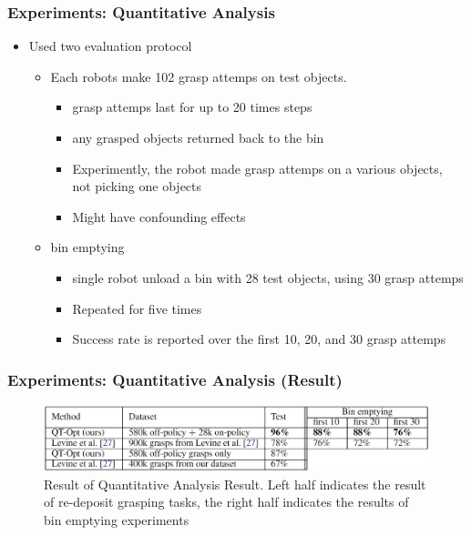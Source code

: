 \documentclass{beamer}
\newcommand{\sixthSec}{Experiments}
\begin{document}
    \begin{frame}
      \frametitle{\sixthSec : Quantitative Analysis}
      \begin{itemize}
        \item Used two evaluation protocol
        \begin{itemize}
          \item Each robots make 102 grasp attemps on test objects.
          \begin{itemize}
            \item grasp attemps last for up to 20 times steps
            \item any grasped objects returned back to the bin
            \item Experimently, the robot made grasp attemps on a various objects, \\
                  not picking one objects
            \item Might have confounding effects
          \end{itemize}
          \pause
          \item bin emptying
          \begin{itemize}
            \item single robot unload a bin with 28 test objects, using 30 grasp attemps
            \item Repeated for five times
            \item Success rate is reported over the first 10, 20, and 30 grasp attemps
          \end{itemize}
        \end{itemize}
      \end{itemize}
    \end{frame}

    \begin{frame}
      \frametitle{\sixthSec: Quantitative Analysis (Result)}
      \begin{figure}
        \centering
        \includegraphics[width = \linewidth]{Images/QuantitativeAnalysisResult.png}
        \caption{Result of Quantitative Analysis Result. \linebreak
                 Left half indicates the result of re-deposit grasping tasks, the right half indicates the results of bin emptying experiments}
        \label{fig:QuantitativeAnalysisResult}
      \end{figure}
    \end{frame}
\end{document}

